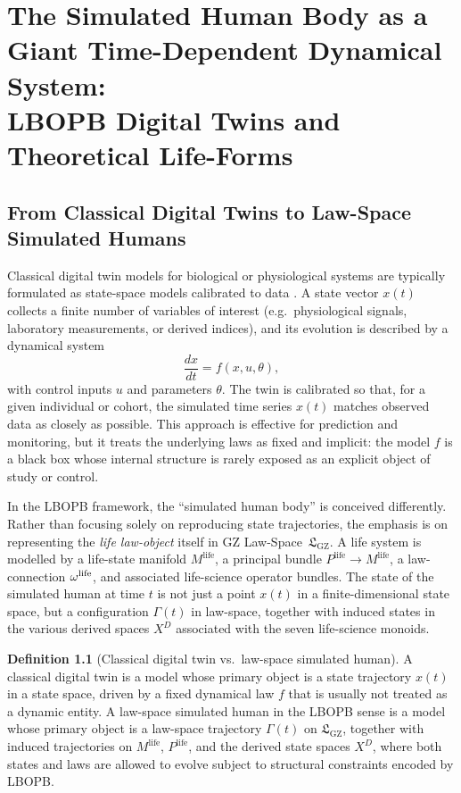 \documentclass[11pt]{book}
\theoremstyle{plain}
\theoremstyle{definition}
\newtheorem{definition}[theorem]{Definition}
\theoremstyle{remark}
\newcommand{\GZLS}{\ensuremath{\mathfrak{L}_{\mathrm{GZ}}}}       \newcommand{\GZLT}{\ensuremath{M_{!w}}}                           \newcommand{\GZLOC}{\ensuremath{A_M}}                             \newcommand{\GZLCurv}{\ensuremath{\mathcal{F}_{\mathrm{law}}}}
\begin{document}
\chapter[The Simulated Human Body as a Giant Time-Dependent System]{The Simulated Human Body as a Giant Time-Dependent Dynamical System:\\
         LBOPB Digital Twins and Theoretical Life-Forms}


\section{From Classical Digital Twins to Law-Space Simulated Humans}


Classical digital twin models for biological or physiological systems
are typically formulated as state-space models calibrated to data
\cite{Grieves2017DigitalTwin}. A
state vector $x(t)$ collects a finite number of variables of interest
(e.g.\ physiological signals, laboratory measurements, or derived
indices), and its evolution is described by a dynamical system
\[
  \frac{dx}{dt} = f(x,u,\theta),
\]
with control inputs $u$ and parameters $\theta$. The twin is
calibrated so that, for a given individual or cohort, the simulated
time series $x(t)$ matches observed data as closely as possible. This
approach is effective for prediction and monitoring, but it treats the
underlying laws as fixed and implicit: the model $f$ is a black box
whose internal structure is rarely exposed as an explicit object of
study or control.

In the LBOPB framework, the ``simulated human body'' is conceived
differently. Rather than focusing solely on reproducing state
trajectories, the emphasis is on representing the \emph{life law-object}
itself in GZ Law-Space~$\GZLS$. A life system is modelled by a
life-state manifold $M^{\mathrm{life}}$, a principal bundle
$P^{\mathrm{life}} \to M^{\mathrm{life}}$, a law-connection
$\omega^{\mathrm{life}}$, and associated life-science operator bundles.
The state of the simulated human at time $t$ is not just a point
$x(t)$ in a finite-dimensional state space, but a configuration
$\Gamma(t)$ in law-space, together with induced states in the various
derived spaces $X^{D}$ associated with the seven life-science monoids.

\begin{definition}[Classical digital twin vs.\ law-space simulated human]
A classical digital twin is a model whose primary object is a state
trajectory $x(t)$ in a state space, driven by a fixed dynamical law
$f$ that is usually not treated as a dynamic entity. A law-space
simulated human in the LBOPB sense is a model whose primary object is
a law-space trajectory $\Gamma(t)$ on $\GZLS$, together with induced
trajectories on $M^{\mathrm{life}}$, $P^{\mathrm{life}}$, and the
derived state spaces $X^{D}$, where both states and laws are allowed
to evolve subject to structural constraints encoded by LBOPB.
\end{definition}
\end{document}
